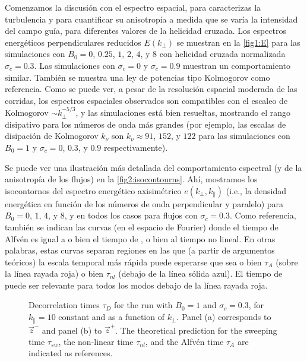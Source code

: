 Comenzamos la discusión con el espectro espacial, para caracterizas la
turbulencia y para cuantificar su anisotropía a medida que se varía la
intensidad del campo guía, para diferentes valores de la helicidad
cruzada.  Los espectros energéticos perpendiculares reducidos
$E(k_\perp)$ se muestran en la \cref{fig1:E} para las simulaciones con
$B_0=0$, $0.25$, $1$, $2$, $4$, y $8$ con helicidad cruzada
normalizada $\sigma_c=0.3$. Las simulaciones con $\sigma_c=0$ y
$\sigma_c=0.9$ muestran un comportamiento similar.  También se muestra
una ley de potencias tipo Kolmogorov como referencia. Como se puede
ver, a pesar de la resolución espacial moderada de las corridas, los
espectros espaciales observados son compatibles con el escaleo de
Kolmogorov $\sim k_\perp^{-5/3}$, y las simulaciones está bien
resueltas, mostrando el rango disipativo para los números de onda más
grandes (por ejemplo, las escalas de disipación de Kolmogorov $k_\nu$
son $k_\nu \approx 91$, $152$, y $122$ para las simulaciones con
$B_0 = 1$ y $\sigma_c = 0$, $0.3$, y $0.9$ respectivamente).

Se puede ver una ilustración más detallada del comportamiento
espectral (y de la anisotropía de los flujos) en la
\cref{fig2:isocontourns}. Ahí, mostramos los isocontornos del espectro
energético axisimétrico $e(k_\perp, k_\parallel)$ (i.e., la densidad
energética en función de los números de onda perpendicular y paralelo)
para $B_0=0$, $1$, $4$, y $8$, y en todos los casos para flujos con
$\sigma_c = 0.3$. Como referencia, también se indican las curvas (en
el espacio de Fourier) donde el tiempo de Alfvén es igual a o bien el
tiempo de \sweeping, o bien al tiempo no lineal.  En otras palabras,
estas curvas separan regiones en las que (a partir de argumentos
teóricos) la escala temporal más rápida puede esperarse que sea o bien
$\tau_A$ (sobre la línea rayada roja) o bien $\tau_{nl}$ (debajo de la
línea sólida azul). El tiempo de \sweeping puede ser relevante para
todos los modos debajo de la línea rayada roja.

\begin{figure}
  \centering
  \caption{Decorrelation times $\tau_D$ for the run with $B_0=1$ and $\sigma_c=0.3$, for $k_\parallel=10$ constant and as a function of $k_\perp$. Panel (a) corresponds to $\vec{z}^-$ and panel (b) to $\vec{z}^+$. The theoretical prediction for the sweeping time $\tau_{sw}$, the non-linear time $\tau_{nl}$, and the Alfv\'en time $\tau_A$ are indicated as references.}
  \label{fig5:z+_vs_z-}
\end{figure}

